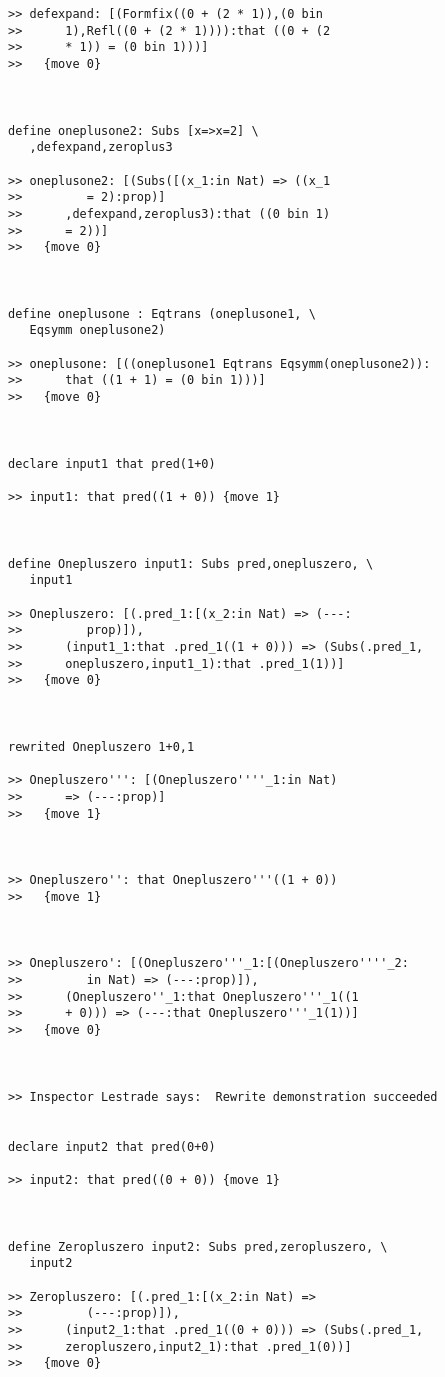 \documentclass{article}
\begin{document}
\begin{verbatim}
>> defexpand: [(Formfix((0 + (2 * 1)),(0 bin
>>      1),Refl((0 + (2 * 1)))):that ((0 + (2
>>      * 1)) = (0 bin 1)))]
>>   {move 0}



define oneplusone2: Subs [x=>x=2] \
   ,defexpand,zeroplus3

>> oneplusone2: [(Subs([(x_1:in Nat) => ((x_1
>>         = 2):prop)]
>>      ,defexpand,zeroplus3):that ((0 bin 1)
>>      = 2))]
>>   {move 0}



define oneplusone : Eqtrans (oneplusone1, \
   Eqsymm oneplusone2)

>> oneplusone: [((oneplusone1 Eqtrans Eqsymm(oneplusone2)):
>>      that ((1 + 1) = (0 bin 1)))]
>>   {move 0}



declare input1 that pred(1+0)

>> input1: that pred((1 + 0)) {move 1}



define Onepluszero input1: Subs pred,onepluszero, \
   input1

>> Onepluszero: [(.pred_1:[(x_2:in Nat) => (---:
>>         prop)]),
>>      (input1_1:that .pred_1((1 + 0))) => (Subs(.pred_1,
>>      onepluszero,input1_1):that .pred_1(1))]
>>   {move 0}



rewrited Onepluszero 1+0,1

>> Onepluszero''': [(Onepluszero''''_1:in Nat)
>>      => (---:prop)]
>>   {move 1}



>> Onepluszero'': that Onepluszero'''((1 + 0))
>>   {move 1}



>> Onepluszero': [(Onepluszero'''_1:[(Onepluszero''''_2:
>>         in Nat) => (---:prop)]),
>>      (Onepluszero''_1:that Onepluszero'''_1((1
>>      + 0))) => (---:that Onepluszero'''_1(1))]
>>   {move 0}



>> Inspector Lestrade says:  Rewrite demonstration succeeded


declare input2 that pred(0+0)

>> input2: that pred((0 + 0)) {move 1}



define Zeropluszero input2: Subs pred,zeropluszero, \
   input2

>> Zeropluszero: [(.pred_1:[(x_2:in Nat) =>
>>         (---:prop)]),
>>      (input2_1:that .pred_1((0 + 0))) => (Subs(.pred_1,
>>      zeropluszero,input2_1):that .pred_1(0))]
>>   {move 0}




\end{verbatim}
\end{document}
